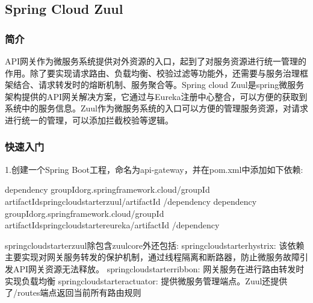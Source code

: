 \documentclass[letterpaper,10pt,english]{sphinxmanual}
\begin{document}
\subsection{Spring Cloud Zuul}
\label{\detokenize{01.spring-cloud/04.zuul/zuul:spring-cloud-zuul}}\label{\detokenize{01.spring-cloud/04.zuul/zuul::doc}}

\subsubsection{简介}
\label{\detokenize{01.spring-cloud/04.zuul/zuul_01:id1}}\label{\detokenize{01.spring-cloud/04.zuul/zuul_01::doc}}
API网关作为微服务系统提供对外资源的入口，起到了对服务资源进行统一管理的作用。除了要实现请求路由、负载均衡、校验过滤等功能外，还需要与服务治理框架结合、请求转发时的熔断机制、服务聚合等。Spring cloud Zuul是spring微服务架构提供的API网关解决方案，它通过与Eureka注册中心整合，可以方便的获取到系统中的服务信息。Zuul作为微服务系统的入口可以方便的管理服务资源，对请求进行统一的管理，可以添加拦截校验等逻辑。


\subsubsection{快速入门}
\label{\detokenize{01.spring-cloud/04.zuul/zuul_01:id2}}
\noindent{}

1.创建一个Spring Boot工程，命名为api-gateway，并在pom.xml中添加如下依赖:

\begin{sphinxVerbatim}[commandchars=\\\{\}]
\PYGZlt{}dependency\PYGZgt{}
    \PYGZlt{}groupId\PYGZgt{}org.springframework.cloud\PYGZlt{}/groupId\PYGZgt{}
    \PYGZlt{}artifactId\PYGZgt{}spring\PYGZhy{}cloud\PYGZhy{}starter\PYGZhy{}zuul\PYGZlt{}/artifactId\PYGZgt{}
\PYGZlt{}/dependency\PYGZgt{}
\PYGZlt{}dependency\PYGZgt{}
    \PYGZlt{}groupId\PYGZgt{}org.springframework.cloud\PYGZlt{}/groupId\PYGZgt{}
    \PYGZlt{}artifactId\PYGZgt{}spring\PYGZhy{}cloud\PYGZhy{}starter\PYGZhy{}eureka\PYGZlt{}/artifactId\PYGZgt{}
\PYGZlt{}/dependency\PYGZgt{}

spring\PYGZhy{}cloud\PYGZhy{}starter\PYGZhy{}zuul除包含zuul\PYGZhy{}core外还包括:
    spring\PYGZhy{}cloud\PYGZhy{}starter\PYGZhy{}hystrix: 该依赖主要实现对网关服务转发的保护机制，通过线程隔离和断路器，防止微服务故障引发API网关资源无法释放。
    spring\PYGZhy{}cloud\PYGZhy{}starter\PYGZhy{}ribbon: 网关服务在进行路由转发时实现负载均衡
    spring\PYGZhy{}cloud\PYGZhy{}starter\PYGZhy{}actuator: 提供微服务管理端点。Zuul还提供了/routes端点返回当前所有路由规则
\end{sphinxVerbatim}
\end{document}
